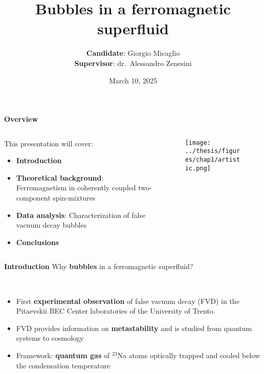 \documentclass[aspectratio=169]{beamer}
\title[Bubbles in a ferromagnetic superfluid] %
{Bubbles in a ferromagnetic superfluid} %
\author{\textbf{Candidate}: Giorgio Micaglio\\\textbf{Supervisor}: dr.\ Alessandro Zenesini}
\institute{Bachelor's Degree in Physics}
\date[March 10, 2025]  %
{March 10, 2025} %
\begin{document}
\begin{frame}[plain]
  \titlepage
\end{frame}

\begin{frame}{\textbf{Overview}}
  \begin{columns}
      \begin{column}{0.7\textwidth}
          This presentation will cover:
          \begin{itemize}
              \item \textbf{Introduction}
              \item \textbf{Theoretical background}: Ferromagnetism in coherently coupled two-component spin-mixtures
              \item \textbf{Data analysis}: Characterization of false vacuum decay bubbles
              \item \textbf{Conclusions}
          \end{itemize}
      \end{column}
      \begin{column}{0.3\textwidth}
          \begin{figure}
              \centering
              \texttt{[image: ../thesis/figures/chap1/artistic.png]}
          \end{figure}
      \end{column}
  \end{columns}
\end{frame}

\begin{frame}{\textbf{Introduction}}
  Why \textbf{bubbles} in a ferromagnetic superfluid?

  ~

  \begin{itemize}
      \item First \textbf{experimental observation} of false vacuum decay (FVD) in the Pitaevskii BEC Center laboratories of the University of Trento.
      \item FVD provides information on \textbf{metastability} and is studied from quantum systems to cosmology
      \item Framework: \textbf{quantum gas} of $^{23}$Na atoms optically trapped and cooled below the condensation temperature
  \end{itemize}
  
\end{frame}

\end{document}

